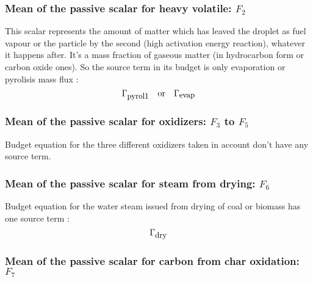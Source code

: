 \subsubsection{Mean of the passive scalar for heavy volatile: $F_{2}$}  

This scalar represents the amount of matter which has leaved the droplet as fuel
vapour or the particle by the second (high activation energy reaction), whatever
it happens after. It's a mass fraction of gaseous matter (in hydrocarbon form or
carbon oxide ones). So the source term in its budget is only evaporation or
pyrolisis mass flux :
\begin{equation}
    \Gamma_{\mbox{\small pyrol1}} \quad \text{or} \quad \Gamma_{\mbox{\small evap}}
\end{equation}     

\subsubsection{Mean of the passive scalar for oxidizers: $F_{3}$ to $F_{5}$}  

Budget equation for the three different oxidizers taken in account don't have
any source term.
\subsubsection{Mean of the passive scalar for steam from drying: $F_{6}$}  
 
Budget equation for the water steam issued from drying of coal or biomass has
one source term :
\begin{equation}
    \Gamma_{\mbox{\small dry}} 
\end{equation} 

                                              
\subsubsection{Mean of the passive scalar for carbon from char oxidation: $F_{7}$}  
  
